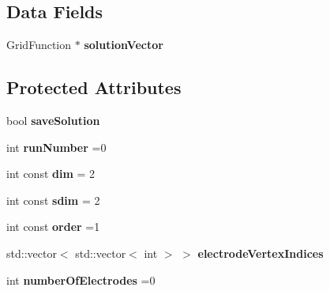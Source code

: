 \subsection*{Data Fields}
\begin{DoxyCompactItemize}
\item 
\mbox{\label{classFiniteElementeBase_a0404964ec0d8191aba580cb49408c739}} 
Grid\+Function $\ast$ {\bfseries solution\+Vector}
\end{DoxyCompactItemize}
\subsection*{Protected Attributes}
\begin{DoxyCompactItemize}
\item 
\mbox{\label{classFiniteElementeBase_a8ce243d0436c3a95ae35aba9ffdc52a7}} 
bool {\bfseries save\+Solution}
\item 
\mbox{\label{classFiniteElementeBase_abe51bdeb3c0d4800d559aadca68e3766}} 
int {\bfseries run\+Number} =0
\item 
\mbox{\label{classFiniteElementeBase_a22655271a630485ae93a5ac236797ea6}} 
int const {\bfseries dim} = 2
\item 
\mbox{\label{classFiniteElementeBase_ab1bc15c8fe252733b46e864237df1789}} 
int const {\bfseries sdim} = 2
\item 
\mbox{\label{classFiniteElementeBase_abb99e7c3a55eb43caf5079f87f60afd3}} 
int const {\bfseries order} =1
\item 
\mbox{\label{classFiniteElementeBase_a266d74a52e8371f5c40ee8318bfc6823}} 
std\+::vector$<$ std\+::vector$<$ int $>$ $>$ {\bfseries electrode\+Vertex\+Indices}
\item 
\mbox{\label{classFiniteElementeBase_ad2d47704e683cbe72d8d7c5a2d35d01e}} 
int {\bfseries number\+Of\+Electrodes} =0
\item 
\mbox{\label{classFiniteElementeBase_a2a563d27f0c4c717aaf06d93260eb973}} 

\end{DoxyCompactItemize}
